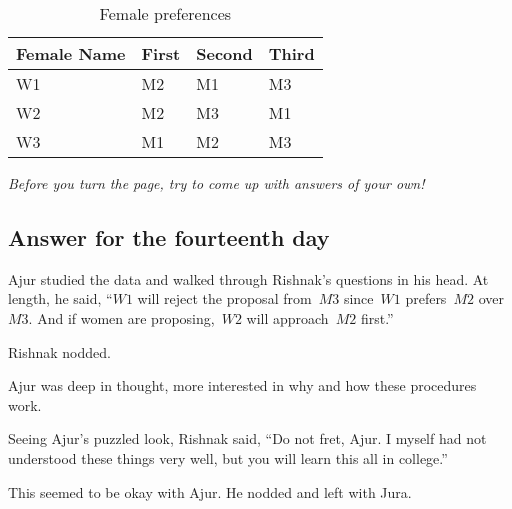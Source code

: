 \begin{table}
\begin{center}
\begin{tabular}{ |p{3cm}||p{1.5cm}||p{1.5cm} || p{1.5cm}|| }
 \hline
 \hline
 Female Name & First&Second&Third\\
 \hline
 W1 & M2    &M1&M3\\
W2&M2&M3&M1\\
W3&M1&M2&M3\\
 
 
 \hline
\end{tabular}
\caption{Female preferences}\label{16tq2}
\end{center}
\end{table}

\textit{Before you turn the page, try to come up with answers of your own!}

\newpage
\subsection*{Answer for the fourteenth day}
Ajur studied the data and walked through Rishnak's questions in his head. At length, he said, ``$W1$ will reject the proposal from~$M3$ since~$W1$ prefers~$M2$ over~$M3$. And if women are proposing,~$W2$ will approach~$M2$ first.''

Rishnak nodded.

Ajur was deep in thought, more interested in why and how these procedures work.

Seeing Ajur's puzzled look, Rishnak said, ``Do not fret, Ajur. I myself had not understood these things very well, but you will learn this all in college.''

This seemed to be okay with Ajur. He nodded and left with Jura.
